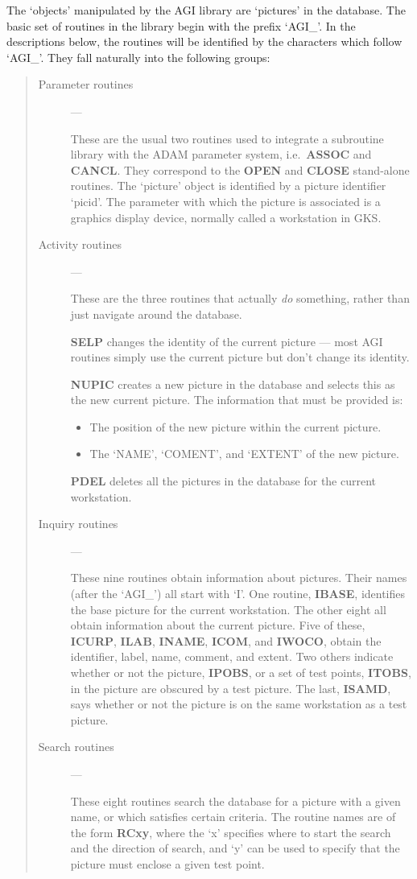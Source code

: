 The `objects' manipulated by the AGI library are `pictures' in the database.
The basic set of routines in the library begin with the prefix `AGI\_'.
In the descriptions below, the routines will be identified by the characters
which follow `AGI\_'.
They fall naturally into the following groups:
\begin{quote}
\begin{description}

\item [Parameter routines] ---

These are the usual two routines used to integrate a subroutine library with
the ADAM parameter system, i.e.\ {\bf ASSOC} and {\bf CANCL}.
They correspond to the {\bf OPEN} and {\bf CLOSE} stand-alone routines.
The `picture' object is identified by a picture identifier `picid'.
The parameter with which the picture is associated is a graphics display 
device,
normally called a workstation in GKS.

\item [Activity routines] ---

These are the three routines that actually {\em do} something, rather than just
navigate around the database.

{\bf SELP} changes the identity of the current picture --- most AGI routines
 simply use the current picture but don't change its identity.

{\bf NUPIC} creates a new picture in the database and selects this as the
new current picture.
The information that must be provided is:
\begin{itemize}
\item The position of the new picture within the current picture.
\item The `NAME', `COMENT', and `EXTENT' of the new picture.
\end{itemize}
{\bf PDEL} deletes all the pictures in the database for the current workstation.

\item [Inquiry routines] ---

These nine routines obtain information about pictures.
Their names (after the `AGI\_') all start with `I'.
One routine, {\bf IBASE}, identifies the base picture for the current
workstation.
The other eight all obtain information about the current picture.
Five of these, {\bf ICURP}, {\bf ILAB}, {\bf INAME}, {\bf ICOM}, and
{\bf IWOCO}, obtain the identifier, label, name, comment, and extent.
Two others indicate whether or not the picture, {\bf IPOBS}, or a set of
test points, {\bf ITOBS}, in the picture are obscured by a test picture.
The last, {\bf ISAMD}, says whether or not the picture is on the same
workstation as a test picture.

\item [Search routines] ---

These eight routines search the database for a picture with a given name, or
which satisfies certain criteria.
The routine names are of the form {\bf RCxy}, where the `x' specifies where to
start the search and the direction of search, and  `y' can be used to specify
that the picture must enclose a given test point.
\end{description}
\end{quote}


